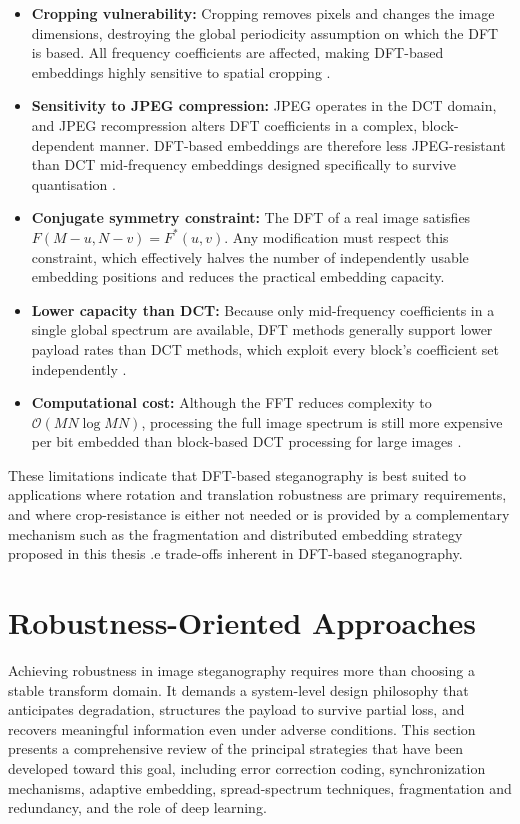 \documentclass[12pt,a4paper,oneside]{report}
\begin{document}
	\begin{itemize}
		\item \textbf{Cropping vulnerability:} Cropping removes pixels and changes the image
		dimensions, destroying the global periodicity assumption on which the DFT is based.
		All frequency coefficients are affected, making DFT-based embeddings highly sensitive
		to spatial cropping \cite{petitcolas1999information}.
		\item \textbf{Sensitivity to JPEG compression:} JPEG operates in the DCT domain, and
		JPEG recompression alters DFT coefficients in a complex, block-dependent manner.
		DFT-based embeddings are therefore less JPEG-resistant than DCT mid-frequency
		embeddings designed specifically to survive quantisation \cite{cox2007digital}.
		\item \textbf{Conjugate symmetry constraint:} The DFT of a real image satisfies
		$F(M-u, N-v) = F^*(u,v)$. Any modification must respect this constraint, which
		effectively halves the number of independently usable embedding positions and
		reduces the practical embedding capacity.
		\item \textbf{Lower capacity than DCT:} Because only mid-frequency coefficients in a
		single global spectrum are available, DFT methods generally support lower payload
		rates than DCT methods, which exploit every block's coefficient set independently
		\cite{Fridrich2012}.
		\item \textbf{Computational cost:} Although the FFT reduces complexity to
		$\mathcal{O}(MN\log MN)$, processing the full image spectrum is still more
		expensive per bit embedded than block-based DCT processing for large images
		\cite{cooley1965algorithm}.
	\end{itemize}
	
	These limitations indicate that DFT-based steganography is best suited to applications
	where rotation and translation robustness are primary requirements, and where crop-resistance
	is either not needed or is provided by a complementary mechanism such as the fragmentation
	and distributed embedding strategy proposed in this thesis \cite{ruanaidh1998rotation,
		cox2007digital}.e trade-offs inherent in DFT-based steganography.
	
	
	\section{Robustness-Oriented Approaches}
	\label{sec:robustness_approaches}
	
	Achieving robustness in image steganography requires more than choosing a stable transform domain.
	It demands a system-level design philosophy that anticipates degradation, structures the payload
	to survive partial loss, and recovers meaningful information even under adverse conditions.
	This section presents a comprehensive review of the principal strategies that have been developed
	toward this goal, including error correction coding, synchronization mechanisms, adaptive embedding,
	spread-spectrum techniques, fragmentation and redundancy, and the role of deep learning.
	
\end{document}
